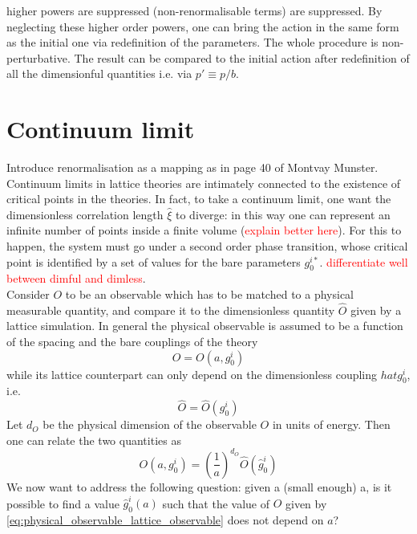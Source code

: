 higher powers are suppressed (non-renormalisable terms) are suppressed. By neglecting these higher order powers, one can bring the action in the same form as the initial one via redefinition of the parameters. The whole procedure is non-perturbative. The result can be compared to the initial action after redefinition of all the dimensionful quantities i.e. via $p'\equiv p/b$. 

\section{Continuum limit}
\label{sec:continuum_limit}
Introduce renormalisation as a mapping as in page 40 of Montvay Munster. \\
Continuum limits in lattice theories are intimately connected to the existence of critical points in the theories. In fact, to take a continuum limit, one want the dimensionless correlation length $\hat \xi$ to diverge: in this way one can represent an infinite number of points inside a finite volume (\textcolor{red}{explain better here}). For this to happen, the system must go under a second order phase transition, whose critical point is identified by a set of values for the bare parameters $g_0^{i*}$. \textcolor{red}{differentiate well between dimful and dimless}. \\
Consider $O$ to be an observable which has to be matched to a physical measurable quantity, and compare it to the dimensionless quantity $\hat O$ given by a lattice simulation. In general the physical observable is assumed to be a function of the spacing and the bare couplings of the theory 
\begin{equation*}
    O = O(a, g^i_0)
\end{equation*}
while its lattice counterpart can only depend on the dimensionless coupling $hat g_0^i$, i.e.
\begin{equation*}
    \hat O = \hat O(g_0^i)
\end{equation*}
Let $d_O$ be the physical dimension of the observable $O$ in units of energy. Then one can relate the two quantities as 
\begin{equation}
    O(a, g^i_0) = \left(\frac{1}{a}\right)^{d_O} \hat O(\hat g_0^i)
    \label{eq:physical_observable_lattice_observable}
\end{equation}
We now want to address the following question: given a (small enough) a, is it possible to find a value $\hat g_0^i(a)$ such that the value of $O$ given by \eqref{eq:physical_observable_lattice_observable} does not depend on $a$? \\
